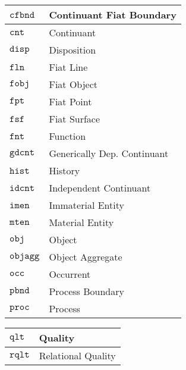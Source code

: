 \documentclass[ao]{iosart2x}
\newcommand{\cn}[1]{\mathtt{#1}}
\newcommand{\bfo}{{\textsc{bfo}}}
\newcommand{\cntbcat}{\cn{cnt}}
\newcommand{\idcntbcat}{\cn{idcnt}}
\newcommand{\gdcntbcat}{\cn{gdcnt}}
\newcommand{\mtenbcat}{\cn{mten}}
\newcommand{\imenbcat}{\cn{imen}}
\newcommand{\objbcat}{\cn{obj}}
\newcommand{\fobjbcat}{\cn{fobj}}
\newcommand{\objaggbcat}{\cn{objagg}}
\newcommand{\cfbndbcat}{\cn{cfbnd}}
\newcommand{\occbcat}{\cn{occ}}
\newcommand{\procbcat}{\cn{proc}}
\newcommand{\pbndbcat}{\cn{pbnd}}
\newcommand{\qltbcat}{\cn{qlt}}
\newcommand{\rqltbcat}{\cn{rqlt}}
\newcommand{\histbcat}{\cn{hist}}
\newcommand{\dispbcat}{\cn{disp}}
\newcommand{\fntbcat}{\cn{fnt}}
\newcommand{\fptbcat}{\cn{fpt}}
\newcommand{\flnbcat}{\cn{fln}}
\newcommand{\fsfbcat}{\cn{fsf}}
\newcommand{\bfopartic}{\textsc{par}}
\begin{document}

\begin{table*}
\caption{Categories of {\bfo}.}\label{table_cat_bfo}
\begin{minipage}{0.43\textwidth}
\hspace{30pt}
\begin{tabular}{|p{}|p{}|}\hline
$\cfbndbcat$ & Continuant Fiat Boundary\\\hline
$\cntbcat$ & Continuant \\\hline
$\dispbcat$ & Disposition \\\hline
$\flnbcat$ & Fiat Line \\\hline
$\fobjbcat$ & Fiat Object \\\hline
$\fptbcat$ & Fiat Point \\\hline
$\fsfbcat$ & Fiat Surface \\\hline
$\fntbcat$ & Function \\\hline
$\gdcntbcat$ & Generically Dep. Continuant \\\hline
$\histbcat$ & History \\\hline
$\idcntbcat$ & Independent Continuant \\\hline
$\imenbcat$ & Immaterial Entity \\\hline
$\mtenbcat$ & Material Entity \\\hline
$\objbcat$ & Object \\\hline
$\objaggbcat$ & Object Aggregate \\\hline
$\occbcat$ & Occurrent \\\hline
$\pbndbcat$ & Process Boundary \\\hline
$\procbcat$ & Process  \\\hline
\end{tabular}
\end{minipage}%
\mbox{}\hfill{}
\begin{minipage}{0.43\textwidth}
  \hspace{-30pt}\begin{tabular}{|p{}|p{}|}
    \hline
$\qltbcat$ & Quality \\\hline
$\rqltbcat$ & Relational Quality \\\hline

\end{tabular}
\end{minipage}
\end{table*}
\end{document}
